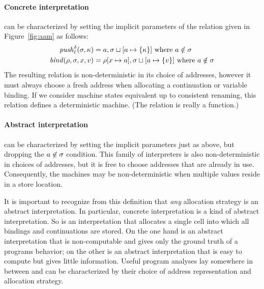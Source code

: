 \documentclass[preprint,onecolumn,9pt]{sigplanconf} %
\begin{document}
\paragraph{Concrete interpretation} can be characterized by setting the implicit
parameters of the relation given in Figure~\ref{fig:aam} as follows:
\begin{align*}
\mathit{push}_{\ell}^{\delta}(\sigma,\kappa) &= a,\sigma\sqcup[a\mapsto\{\kappa\}]
\mbox{ where }a \notin\sigma
\\
\mathit{bind}(\rho,\sigma,x,v) &= \rho[x\mapsto a],\sigma\sqcup[a\mapsto\{v\}]
\mbox{ where }a \notin\sigma
\end{align*}
The resulting relation is non-deterministic in its choice of
addresses, however it must always choose a fresh address when
allocating a continuation or variable binding.  If we consider machine
states equivalent up to consistent renaming, this relation defines
a deterministic machine.  (The relation is really a function.)


\paragraph{Abstract interpretation} can be characterized by setting the implicit
parameters just as above, but dropping the $a \not\in \sigma$
condition.  This family of interpreters is also non-deterministic in
choices of addresses, but it is free to choose addresses that are
already in use.  Consequently, the machines may be non-deterministic
when multiple values reside in a store location.

It is important to recognize from this definition that \emph{any}
allocation strategy is an abstract interpretation.  In particular,
concrete interpretation is a kind of abstract interpretation.  So is an
interpretation that allocates a single cell into which all bindings
and continuations are stored.  On the one hand is an abstract
interpretation that is non-computable and gives only the ground truth
of a programs behavior; on the other is an abstract interpretation
that is easy to compute but gives little information.  Useful program
analyses lay somewhere in between and can be characterized by their
choice of address representation and allocation strategy.

\end{document}
